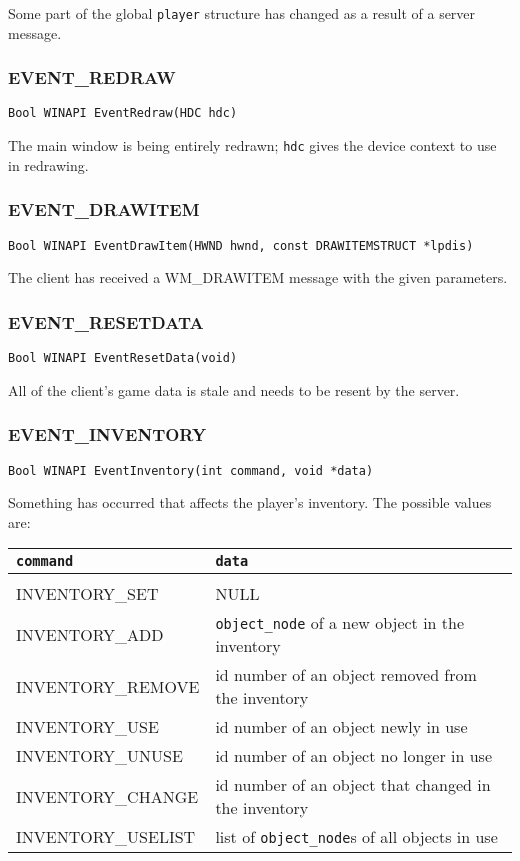 Some part of the global {\tt player} structure has changed as a result
of a server message.

\subsubsection{EVENT\_REDRAW}
\begin{verbatim}
Bool WINAPI EventRedraw(HDC hdc)
\end{verbatim}

The main window is being entirely redrawn; {\tt hdc} gives the device
context to use in redrawing.

\subsubsection{EVENT\_DRAWITEM}
\begin{verbatim}
Bool WINAPI EventDrawItem(HWND hwnd, const DRAWITEMSTRUCT *lpdis)
\end{verbatim}

The client has received a WM\_DRAWITEM message with the given parameters.

\subsubsection{EVENT\_RESETDATA}   
\begin{verbatim}
Bool WINAPI EventResetData(void)
\end{verbatim}

All of the client's game data is stale and needs to be resent by the server.

\subsubsection{EVENT\_INVENTORY}   
\begin{verbatim}
Bool WINAPI EventInventory(int command, void *data)
\end{verbatim}

Something has occurred that affects the player's inventory.  The
possible values are:

\begin{tabular}{l|l} 
{\tt command} & {\tt data} \\
\hline \\
INVENTORY\_SET     &  NULL       \\
INVENTORY\_ADD     &  {\tt object\_node} of a new object in the inventory      \\
INVENTORY\_REMOVE  &  id number of an object removed from the inventory          \\
INVENTORY\_USE     &  id number of an object newly in use          \\
INVENTORY\_UNUSE   &  id number of an object no longer in use \\
INVENTORY\_CHANGE  &  id number of an object that changed in the inventory       \\
INVENTORY\_USELIST &  list of {\tt object\_node}s of all objects in use          \\
\end{tabular}

